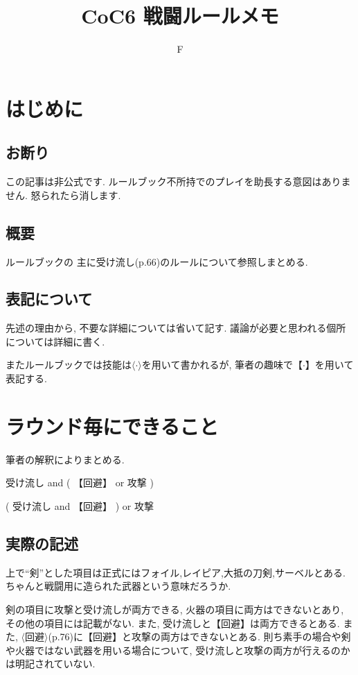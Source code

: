 \documentclass{jsarticle}
\title{CoC6 戦闘ルールメモ}
\author{F}
\begin{document}
\maketitle
\section{はじめに}
\subsection*{お断り}
この記事は非公式です.
ルールブック\cite{1130282268636976512}不所持でのプレイを助長する意図はありません.
怒られたら消します.

\subsection*{概要}
ルールブック\cite{1130282268636976512}の
主に受け流し(p.66)のルールについて参照しまとめる.

\subsection*{表記について}
先述の理由から,
不要な詳細については省いて記す.
議論が必要と思われる個所については詳細に書く.

またルールブックでは技能は$\langle\cdot\rangle$を用いて書かれるが,
筆者の趣味で【$\cdot$】を用いて表記する.


\section{ラウンド毎にできること}
筆者の解釈によりまとめる.
\begin{description}[labelwidth=10em]
    \item[剣
    を持っている場合]
        受け流し and ( 【回避】 or 攻撃 )
    \item[その他]
        ( 受け流し and 【回避】 ) or 攻撃
\end{description}
\subsection*{実際の記述}
上で``剣''とした項目は正式にはフォイル,レイピア,大抵の刀剣,サーベルとある.
ちゃんと戦闘用に造られた武器という意味だろうか.

剣の項目に攻撃と受け流しが両方できる,
火器の項目に両方はできないとあり,
その他の項目には記載がない.
また,
受け流しと【回避】は両方できるとある.
また,
$\langle\mbox{回避}\rangle$(p.76)に【回避】と攻撃の両方はできないとある.
則ち素手の場合や剣や火器ではない武器を用いる場合について,
受け流しと攻撃の両方が行えるのかは明記されていない.
\end{document}
